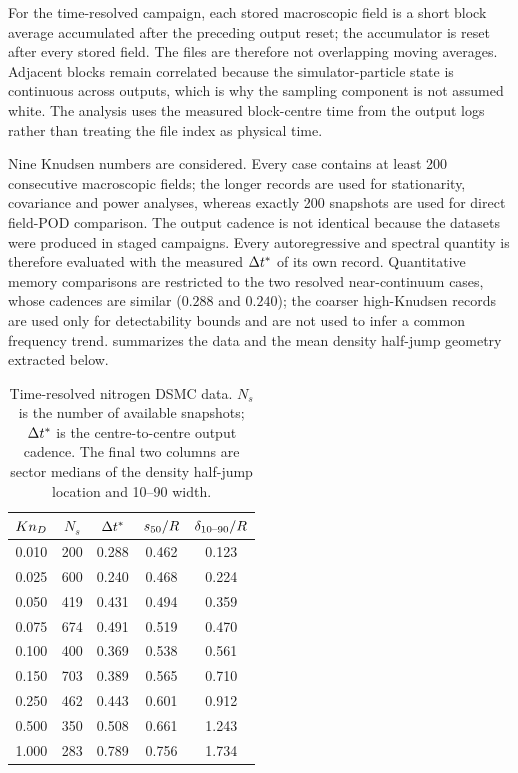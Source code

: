 For the time-resolved campaign, each stored macroscopic field is a short block average accumulated after the preceding output reset; the accumulator is reset after every stored field. The files are therefore not overlapping moving averages. Adjacent blocks remain correlated because the simulator-particle state is continuous across outputs, which is why the sampling component is not assumed white. The analysis uses the measured block-centre time from the output logs rather than treating the file index as physical time.

Nine Knudsen numbers are considered. Every case contains at least 200 consecutive macroscopic fields; the longer records are used for stationarity, covariance and power analyses, whereas exactly 200 snapshots are used for direct field-POD comparison. The output cadence is not identical because the datasets were produced in staged campaigns. Every autoregressive and spectral quantity is therefore evaluated with the measured $\Delta t^*$ of its own record. Quantitative memory comparisons are restricted to the two resolved near-continuum cases, whose cadences are similar ($0.288$ and $0.240$); the coarser high-Knudsen records are used only for detectability bounds and are not used to infer a common frequency trend.  summarizes the data and the mean density half-jump geometry extracted below.

\begin{table}
\centering
\caption{Time-resolved nitrogen DSMC data. $N_s$ is the number of available snapshots; $\Delta t^*$ is the centre-to-centre output cadence. The final two columns are sector medians of the density half-jump location and 10--90 width.}
\label{tab:data}
\small
\begin{tabular}{ccccc}
\toprule
$Kn_D$ & $N_s$ & $\Delta t^*$ & $s_{50}/R$ & $\delta_{10\text{--}90}/R$ \\
\midrule
0.010 & 200 & 0.288 & 0.462 & 0.123 \\
0.025 & 600 & 0.240 & 0.468 & 0.224 \\
0.050 & 419 & 0.431 & 0.494 & 0.359 \\
0.075 & 674 & 0.491 & 0.519 & 0.470 \\
0.100 & 400 & 0.369 & 0.538 & 0.561 \\
0.150 & 703 & 0.389 & 0.565 & 0.710 \\
0.250 & 462 & 0.443 & 0.601 & 0.912 \\
0.500 & 350 & 0.508 & 0.661 & 1.243 \\
1.000 & 283 & 0.789 & 0.756 & 1.734 \\
\bottomrule
\end{tabular}
\end{table}

